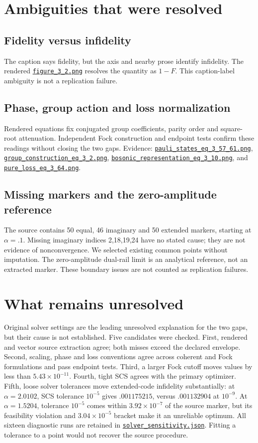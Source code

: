 \documentclass[11pt]{article}
\newcommand{\file}[2]{\href{https://github.com/alectionary/vibe-math/blob/master/formalization/denys-bosonic-pauli/#1}{\nolinkurl{#2}}}
\begin{document}
\section{Ambiguities that were resolved}
\subsection{Fidelity versus infidelity}
The caption says fidelity, but the axis and nearby prose identify infidelity. The rendered \file{source-evidence/figure_3_2.png}{figure_3_2.png} resolves the quantity as $1-F$. This caption-label ambiguity is not a replication failure.
\subsection{Phase, group action and loss normalization}
Rendered equations fix conjugated group coefficients, parity order and square-root attenuation. Independent Fock construction and endpoint tests confirm these readings without closing the two gaps. Evidence: \file{source-evidence/pauli_states_eq_3_57_61.png}{pauli_states_eq_3_57_61.png}, \file{source-evidence/group_construction_eq_3_2.png}{group_construction_eq_3_2.png}, \file{source-evidence/bosonic_representation_eq_3_10.png}{bosonic_representation_eq_3_10.png}, and \file{source-evidence/pure_loss_eq_3_64.png}{pure_loss_eq_3_64.png}.
\subsection{Missing markers and the zero-amplitude reference}
The source contains 50 equal, 46 imaginary and 50 extended markers, starting at $\alpha=.1$. Missing imaginary indices 2,18,19,24 have no stated cause; they are not evidence of nonconvergence. We selected existing common points without imputation. The zero-amplitude dual-rail limit is an analytical reference, not an extracted marker. These boundary issues are not counted as replication failures.

\section{What remains unresolved}
Original solver settings are the leading unresolved explanation for the two gaps, but their cause is not established. Five candidates were checked. First, rendered and vector source extraction agree; both misses exceed the declared envelope. Second, scaling, phase and loss conventions agree across coherent and Fock formulations and pass endpoint tests. Third, a larger Fock cutoff moves values by less than $5.43\times10^{-11}$. Fourth, tight SCS agrees with the primary optimizer. Fifth, loose solver tolerances move extended-code infidelity substantially: at $\alpha=2.0102$, SCS tolerance $10^{-5}$ gives $.001175215$, versus $.001132904$ at $10^{-9}$. At $\alpha=1.5204$, tolerance $10^{-5}$ comes within $3.92\times10^{-7}$ of the source marker, but its feasibility violation and $3.04\times10^{-5}$ bracket make it an unreliable optimum. All sixteen diagnostic runs are retained in \file{outputs/solver_sensitivity.json}{solver_sensitivity.json}. Fitting a tolerance to a point would not recover the source procedure.
\end{document}
